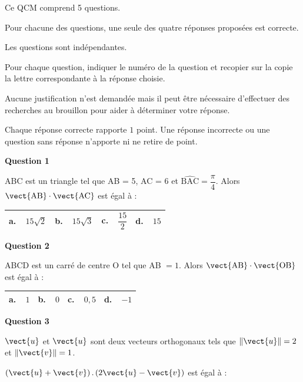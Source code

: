 \medskip

Ce QCM comprend 5 questions.

Pour chacune des questions, une seule des quatre réponses proposées est correcte.

Les questions sont indépendantes.

Pour chaque question, indiquer le numéro de la question et recopier sur la copie la lettre correspondante à la réponse choisie.

Aucune justification n'est demandée mais il peut être nécessaire d'effectuer des recherches au brouillon pour aider à déterminer votre réponse.

Chaque réponse correcte rapporte $1$ point. Une réponse incorrecte ou une question sans réponse n'apporte ni ne retire de point.

\medskip

\textbf{Question 1}

ABC est un triangle tel que AB = 5, AC = 6 et $\widehat{\text{BAC}}= \dfrac{\pi}{4}$. Alors $\vect{\text{AB}} \cdot \vect{\text{AC}}$ est égal à :

\begin{center}
\begin{tabularx}{\linewidth}{|*{4}{X|}}\hline
\textbf{a.~~}$15\sqrt{2}$&\textbf{b.~~}$15\sqrt{3}$&\textbf{c.~~}$\dfrac{15}{2}$\rule[-3mm]{0mm}{9mm}&\textbf{d.~~}$15$\\ \hline
\end{tabularx}
\end{center}

\medskip

\textbf{Question 2}

ABCD est un carré de centre O tel que AB $=1$. Alors $\vect{\text{AB}} \cdot \vect{\text{OB}}$ est égal à :

\begin{center}
\begin{tabularx}{\linewidth}{|*{4}{X|}}\hline
\textbf{a.~~}$1$&\textbf{b.~~}$0$&\textbf{c.~~}$0,5$&\textbf{d.~~}$- 1$\\ \hline
\end{tabularx}
\end{center}

\textbf{Question 3} 

$\vect{u}$ et $\vect{u}$ sont deux vecteurs orthogonaux tels que $\|\vect{u}\| = 2$ et $\|\vect{v}\| = 1$. 

$\left(\vect{u}+\vect{v}\right).\left(2\vect{u} - \vect{v}\right)$ est égal à :

